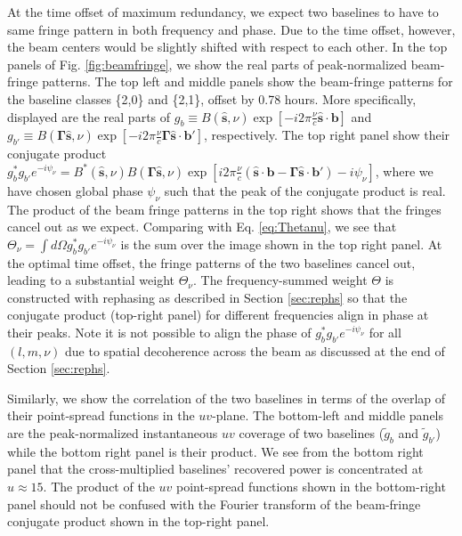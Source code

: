 \documentclass[twocolumn,apj,numberedappendix]{emulateapj}
\renewcommand\[{\begin{equation}}
\renewcommand\]{\end{equation}}
\begin{document}
At the time offset of maximum redundancy, we expect two baselines to have to same fringe pattern in both frequency and phase. Due to the time offset, however, the beam centers would be slightly shifted with respect to each other. In the top panels of Fig. \ref{fig:beamfringe}, we show the real parts of peak-normalized beam-fringe patterns. The top left and middle panels show the beam-fringe
patterns for the baseline classes \{2,0\} and \{2,1\}, offset by 0.78 hours. More specifically, displayed are the real parts of $g_b\equiv B(\hat{\boldsymbol{s}},\nu)\exp\left[-i2\pi\frac{\nu}{c}\hat{\boldsymbol{s}}\cdot\boldsymbol{b}\right]$ and $g_{b'}\equiv B(\boldsymbol{\Gamma}\hat{\boldsymbol{s}},\nu)\exp\left[-i2\pi\frac{\nu}{c}\boldsymbol{\Gamma}\hat{\boldsymbol{s}}\cdot\boldsymbol{b'}\right]$, respectively. The top right panel show their conjugate product $g_{b}^{*}g_{b'}e^{-i\psi_\nu} = B^{*}(\hat{\boldsymbol{s}},\nu)B(\boldsymbol{\Gamma}\hat{\boldsymbol{s}},\nu)\exp\left[i2\pi\frac{\nu}{c}\left(\hat{\boldsymbol{s}}\cdot\boldsymbol{b}-\boldsymbol{\Gamma}\hat{\boldsymbol{s}}\cdot\boldsymbol{b'}\right)-i\psi_{\nu}\right]$, where we have chosen global phase $\psi_{\nu}$ such that the peak of the conjugate product is real. The product of the beam fringe patterns in the top right shows that the fringes
 cancel out as we expect. Comparing with Eq. \eqref{eq:Thetanu}, we see that $\Theta_\nu=\int d\Omega g_{b}^{*}g_{b'}e^{-i\psi_\nu}$ is the sum over the image shown in the top right panel. At the optimal time offset, the fringe patterns of the two baselines cancel out, leading to a substantial weight $\Theta_\nu$. The frequency-summed weight $\Theta$ is constructed with rephasing as described in Section \ref{sec:rephs} so that the conjugate product (top-right panel) for different frequencies align in phase at their peaks. Note it is not possible to align the phase of $g_{b}^{*}g_{b'}e^{-i\psi_\nu}$ for all $(l,m,\nu)$ due to spatial decoherence across the beam as discussed at the end of Section \ref{sec:rephs}. 
 
Similarly, we show the correlation of the two baselines in terms of the overlap of their point-spread functions in the $uv$-plane. The bottom-left and middle panels are the peak-normalized instantaneous $uv$ coverage of two baselines ($\widetilde{g}_{b}$ and $\widetilde{g}_{b'}$) while the bottom right panel is their product. We see from the bottom right panel that the cross-multiplied baselines' recovered power is concentrated at $u\approx15$. The product of the $uv$ point-spread functions shown in the bottom-right panel should not be confused with the Fourier transform of the beam-fringe conjugate product shown in the top-right panel. 
\end{document}
